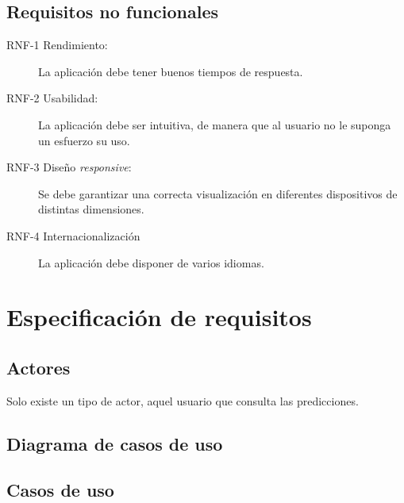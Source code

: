 	\subsection{Requisitos no funcionales}

\begin{description}
	\item[RNF-1 Rendimiento:] La aplicación debe tener buenos tiempos de respuesta.
	\item[RNF-2 Usabilidad:] La aplicación debe ser intuitiva, de manera que al usuario no le suponga un esfuerzo su uso.
	\item[RNF-3 Diseño \emph{responsive}:] Se debe garantizar una correcta visualización en diferentes dispositivos de distintas dimensiones.
	\item[RNF-4 Internacionalización] La aplicación debe disponer de varios idiomas.
\end{description}


\section{Especificación de requisitos}

	\subsection{Actores}
Solo existe un tipo de actor, aquel usuario que consulta las predicciones.

	\subsection{Diagrama de casos de uso}

	\subsection{Casos de uso}

